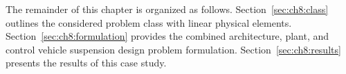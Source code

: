 The remainder of this chapter is organized as follows.
Section~\ref{sec:ch8:class} outlines the considered problem class with linear physical elements.
Section~\ref{sec:ch8:formulation} provides the combined architecture, plant, and control vehicle suspension design problem formulation.
Section~\ref{sec:ch8:results} presents the results of this case study.








